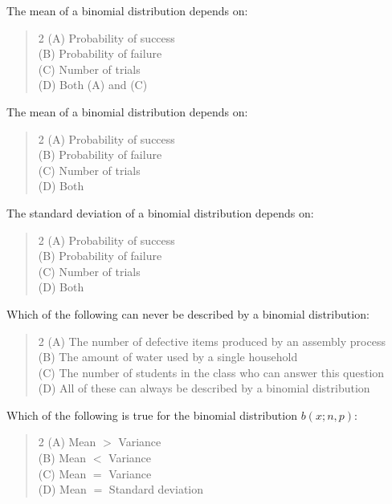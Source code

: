 \documentclass[11pt,a4paper]{article}
\begin{document}
\begin{mcqlist}
\item The mean of a binomial distribution depends on:
\begin{quote}\begin{multicols}{2}
\noindent (A) Probability of success \\
(B) Probability of failure \\
(C) Number of trials \\
(D) Both (A) and (C)
\end{multicols}\end{quote}

\item The mean of a binomial distribution depends on:
\begin{quote}\begin{multicols}{2}
\noindent (A) Probability of success \\
(B) Probability of failure \\
(C) Number of trials \\
(D) Both
\end{multicols}\end{quote}

\item The standard deviation of a binomial distribution depends on:
\begin{quote}\begin{multicols}{2}
\noindent (A) Probability of success \\
(B) Probability of failure \\
(C) Number of trials \\
(D) Both
\end{multicols}\end{quote}

\item Which of the following can never be described by a binomial distribution:
\begin{quote}\begin{multicols}{2}
\noindent (A) The number of defective items produced by an assembly process \\
(B) The amount of water used by a single household \\
(C) The number of students in the class who can answer this question \\
(D) All of these can always be described by a binomial distribution
\end{multicols}\end{quote}

\item Which of the following is true for the binomial distribution $b(x;n,p)$:
\begin{quote}\begin{multicols}{2}
\noindent (A) Mean $>$ Variance \\
(B) Mean $<$ Variance \\
(C) Mean $=$ Variance \\
(D) Mean $=$ Standard deviation
\end{multicols}\end{quote}


\end{mcqlist}
\end{document}
